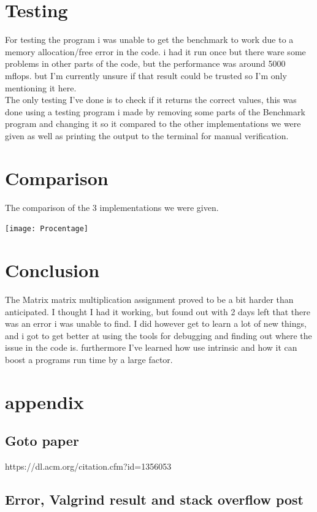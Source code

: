 \documentclass[a4paper,10pt,titlepage]{report}
\begin{document}
\section{Testing}
For testing the program i was unable to get the benchmark to work due to a memory allocation/free error in the code. i had it run once but there ware some problems 
in other parts of the code, but the performance was around 5000 mflops. but I'm currently unsure if that result could be trusted so I'm only mentioning it here.\\

The only testing I've done is to check if it returns the correct values, this was done using a testing program i made by removing some parts of the Benchmark program and changing it so it compared to the other implementations we were given as well as printing the output to the terminal for manual verification.

\section{Comparison}
The comparison of the 3 implementations we were given.


\texttt{[image: Procentage]}

\section{Conclusion}
The Matrix matrix multiplication assignment proved to be a bit harder than anticipated. I thought I had it working, but found out with 2 days left that there was an error i was unable to find. I did however get to learn a lot of new things, and i got to get better at using the tools for debugging and finding out where the issue in the code is. furthermore I've learned how use intrinsic and how it can boost a programs run time by a large factor.

\newpage
\section{appendix}
\subsection{Goto paper }
https://dl.acm.org/citation.cfm?id=1356053 \\
\subsection{Error, Valgrind result and stack overflow post }
\end{document}
